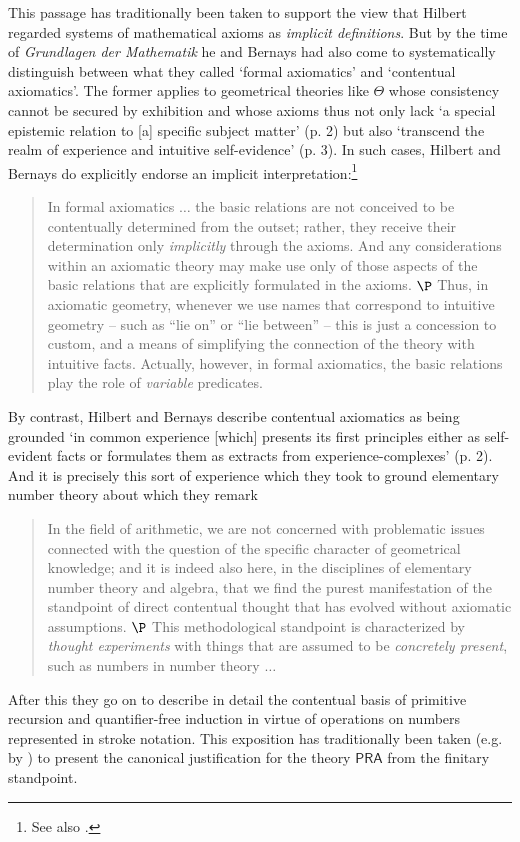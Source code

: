 \documentclass[11pt,fleqn,leqno]{article}
\begin{document}
This passage has traditionally been taken to support the view that Hilbert regarded systems of mathematical axioms as \textsl{implicit definitions}.   But by the time of \textsl{Grundlagen der Mathematik} he and Bernays had also come to systematically distinguish between what they called `formal axiomatics' and `contentual axiomatics'. The former applies to geometrical theories like $\Theta$ whose consistency cannot be secured by exhibition and whose axioms thus not only lack `a special epistemic relation to [a] specific subject matter' (p. 2) but also  `transcend the realm of experience and intuitive self-evidence' (p. 3).   In such cases, Hilbert and Bernays do explicitly endorse an implicit interpretation:\footnote{See also \citep[p. 497]{Bernays1967}.}
\begin{quote}
{\small 
In formal axiomatics $\ldots$ the basic relations are not conceived to be contentually determined from the outset; rather, they receive their determination only \textsl{implicitly} through the axioms.   And any considerations within an axiomatic theory may make use only of those aspects of the basic relations that are explicitly formulated in the axioms.  $\P$ Thus, in axiomatic geometry, whenever we use names that correspond to intuitive geometry -- such as ``lie on'' or ``lie between'' -- this is just a concession to custom, and a means of simplifying the connection of the theory with intuitive facts. Actually, however, in formal axiomatics, the basic relations play the role of \textsl{variable} predicates. \hfill \citeyearpar[p. 7]{Hilbert1934}
}
\end{quote}

By contrast, Hilbert and Bernays describe contentual axiomatics as being grounded `in common experience [which] presents its first principles either as self-evident facts or formulates them as extracts from experience-complexes' (p. 2).    And it is precisely this sort of experience which they took to ground elementary number theory about which they remark
\begin{quote}
{\small 
In the field of arithmetic, we are not concerned with problematic issues connected with the question of the specific character of geometrical knowledge; and it is indeed also here, in the disciplines of elementary number theory and algebra, that we find the purest manifestation of the standpoint of direct contentual thought that has evolved without axiomatic assumptions. $\P$ This methodological standpoint is characterized by \textsl{thought experiments} with things that are assumed to be \textsl{concretely present}, such as numbers in number theory $\ldots$ \hfill \citeyearpar[p. 20]{Hilbert1934}
}
\end{quote}
After this they go on to describe in detail the contentual basis of primitive recursion and quantifier-free induction in virtue of operations on numbers represented in stroke notation.   This exposition has traditionally been taken (e.g. by \citealp[\S 1-\S 2]{Tait2005}) to present the canonical justification for the theory $\mathsf{PRA}$ from the finitary standpoint.   
\end{document}
